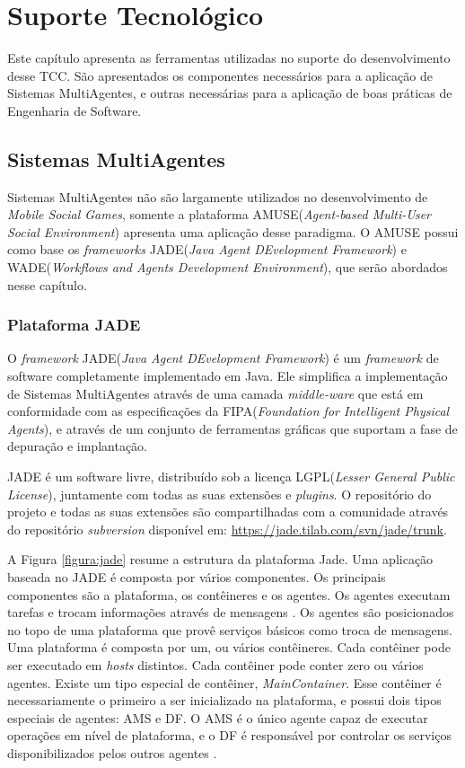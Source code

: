 \chapter{Suporte Tecnológico}

Este capítulo apresenta as ferramentas utilizadas no suporte do desenvolvimento desse TCC. São apresentados os componentes necessários para a aplicação de Sistemas MultiAgentes, e outras necessárias para a aplicação de boas práticas de Engenharia de Software.

\section{Sistemas MultiAgentes}

Sistemas MultiAgentes não são largamente utilizados no desenvolvimento de \textit{Mobile Social Games}, somente a plataforma AMUSE(\textit{Agent-based Multi-User Social Environment}) apresenta uma aplicação desse paradigma. O AMUSE possui como base os \textit{frameworks} JADE(\textit{Java Agent DEvelopment Framework}) e WADE(\textit{Workflows and Agents Development Environment}), que serão abordados nesse capítulo.

    \subsection{Plataforma JADE}

O \textit{framework} JADE(\textit{Java Agent DEvelopment Framework}) é um \textit{framework} de software completamente implementado em Java. Ele simplifica a implementação de Sistemas MultiAgentes através de uma camada \textit{middle-ware} que está em conformidade com as especificações da FIPA(\textit{Foundation for Intelligent Physical Agents}), e através de um conjunto de ferramentas gráficas que suportam a fase de depuração e implantação\cite{jade}.

JADE é um software livre, distribuído sob a licença LGPL(\textit{Lesser General Public License}), juntamente com todas as suas extensões e \textit{plugins}. O repositório do projeto e todas as suas extensões são compartilhadas com a comunidade através do repositório \textit{subversion} disponível em: \url{https://jade.tilab.com/svn/jade/trunk}.

A Figura \ref{figura:jade} resume a estrutura da plataforma Jade. Uma aplicação baseada no JADE é composta por vários componentes. Os principais componentes são a plataforma, os contêineres e os agentes. Os agentes executam tarefas e trocam informações através de mensagens \cite{fabio2007}. Os agentes são posicionados no topo de uma plataforma que provê serviços básicos como troca de mensagens. Uma plataforma é composta por um, ou vários contêineres. Cada contêiner pode ser executado em \textit{hosts} distintos. Cada contêiner pode conter zero ou vários agentes. Existe um tipo especial de contêiner, \textit{MainContainer}. Esse contêiner é necessariamente o primeiro a ser inicializado na plataforma, e possui dois tipos especiais de agentes: AMS e DF. O AMS é o único agente capaz de executar operações em nível de plataforma, e o DF é responsável por controlar os serviços disponibilizados pelos outros agentes \cite{jade}.

